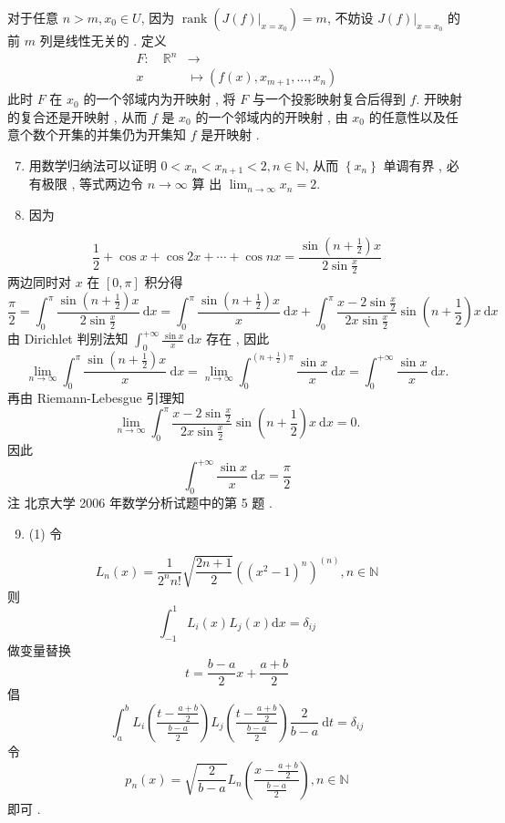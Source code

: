 \documentclass[10pt]{article}
\begin{document}
 对于任意  $n>m, x_{0} \in U$,  因为  $\operatorname{rank}\left(\left.J(f)\right|_{x=x_{0}}\right)=m$,  不妨设  $\left.J(f)\right|_{x=x_{0}}$  的前  $m$  列是线性无关的 .  定义 
$$
\begin{aligned}
F: \quad \mathbb{R}^{n} & \longrightarrow \\
x & \longmapsto\left(f(x), x_{m+1}, \ldots, x_{n}\right)
\end{aligned}
$$
 此时  $F$  在  $x_{0}$  的一个邻域内为开映射 ,  将  $F$  与一个投影映射复合后得到  $f$.  开映射的复合还是开映射 ,  从而  $f$  是  $x_{0}$  的一个邻域内的开映射 ,  由  $x_{0}$  的任意性以及任意个数个开集的并集仍为开集知  $f$  是开映射 .

\begin{enumerate}
  \setcounter{enumi}{6}
  \item  用数学归纳法可以证明  $0<x_{n}<x_{n+1}<2, n \in \mathbb{N}$,  从而  $\left\{x_{n}\right\}$  单调有界 ,  必有极限 ,  等式两边令  $n \rightarrow \infty$  算   出  $\lim _{n \rightarrow \infty} x_{n}=2$.

  \item  因为 

\end{enumerate}
$$
\frac{1}{2}+\cos x+\cos 2 x+\cdots+\cos n x=\frac{\sin \left(n+\frac{1}{2}\right) x}{2 \sin \frac{x}{2}}
$$
 两边同时对  $x$  在  $[0, \pi]$  积分得 
$$
\frac{\pi}{2}=\int_{0}^{\pi} \frac{\sin \left(n+\frac{1}{2}\right) x}{2 \sin \frac{x}{2}} \mathrm{~d} x=\int_{0}^{\pi} \frac{\sin \left(n+\frac{1}{2}\right) x}{x} \mathrm{~d} x+\int_{0}^{\pi} \frac{x-2 \sin \frac{x}{2}}{2 x \sin \frac{x}{2}} \sin \left(n+\frac{1}{2}\right) x \mathrm{~d} x
$$
 由  Dirichlet  判别法知  $\int_{0}^{+\infty} \frac{\sin x}{x} \mathrm{~d} x$  存在 ,  因此 
$$
\lim _{n \rightarrow \infty} \int_{0}^{\pi} \frac{\sin \left(n+\frac{1}{2}\right) x}{x} \mathrm{~d} x=\lim _{n \rightarrow \infty} \int_{0}^{\left(n+\frac{1}{2}\right) \pi} \frac{\sin x}{x} \mathrm{~d} x=\int_{0}^{+\infty} \frac{\sin x}{x} \mathrm{~d} x .
$$
 再由  Riemann-Lebesgue  引理知 
$$
\lim _{n \rightarrow \infty} \int_{0}^{\pi} \frac{x-2 \sin \frac{x}{2}}{2 x \sin \frac{x}{2}} \sin \left(n+\frac{1}{2}\right) x \mathrm{~d} x=0 .
$$
 因此 
$$
\int_{0}^{+\infty} \frac{\sin x}{x} \mathrm{~d} x=\frac{\pi}{2}
$$
 注   北京大学  2006  年数学分析试题中的第  5  题 .

\begin{enumerate}
  \setcounter{enumi}{8}
  \item (1)  令 
\end{enumerate}
$$
L_{n}(x)=\frac{1}{2^{n} n !} \sqrt{\frac{2 n+1}{2}}\left(\left(x^{2}-1\right)^{n}\right)^{(n)}, n \in \mathbb{N}
$$
 则 
$$
\int_{-1}^{1} L_{i}(x) L_{j}(x) \mathrm{d} x=\delta_{i j}
$$
 做变量替换 
$$
t=\frac{b-a}{2} x+\frac{a+b}{2}
$$
 倡 
$$
\int_{a}^{b} L_{i}\left(\frac{t-\frac{a+b}{2}}{\frac{b-a}{2}}\right) L_{j}\left(\frac{t-\frac{a+b}{2}}{\frac{b-a}{2}}\right) \frac{2}{b-a} \mathrm{~d} t=\delta_{i j}
$$
 令 
$$
p_{n}(x)=\sqrt{\frac{2}{b-a}} L_{n}\left(\frac{x-\frac{a+b}{2}}{\frac{b-a}{2}}\right), n \in \mathbb{N}
$$
 即可 .
\end{document}

